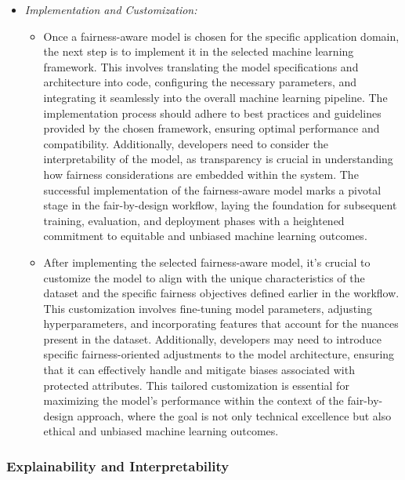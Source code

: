 \begin{itemize}
\begin{itemize}
    \end{itemize}
    
    \item \emph{Implementation and Customization:}
    
    \begin{itemize}
    
        \item Once a fairness-aware model is chosen for the specific application domain, the next step is to implement it in the selected machine learning framework. This involves translating the model specifications and architecture into code, configuring the necessary parameters, and integrating it seamlessly into the overall machine learning pipeline. The implementation process should adhere to best practices and guidelines provided by the chosen framework, ensuring optimal performance and compatibility. Additionally, developers need to consider the interpretability of the model, as transparency is crucial in understanding how fairness considerations are embedded within the system. The successful implementation of the fairness-aware model marks a pivotal stage in the fair-by-design workflow, laying the foundation for subsequent training, evaluation, and deployment phases with a heightened commitment to equitable and unbiased machine learning outcomes.
    
        \item After implementing the selected fairness-aware model, it's crucial to customize the model to align with the unique characteristics of the dataset and the specific fairness objectives defined earlier in the workflow. This customization involves fine-tuning model parameters, adjusting hyperparameters, and incorporating features that account for the nuances present in the dataset. Additionally, developers may need to introduce specific fairness-oriented adjustments to the model architecture, ensuring that it can effectively handle and mitigate biases associated with protected attributes. This tailored customization is essential for maximizing the model's performance within the context of the fair-by-design approach, where the goal is not only technical excellence but also ethical and unbiased machine learning outcomes.
    
    \end{itemize}

\end{itemize}

\subsubsection{Explainability and Interpretability}


